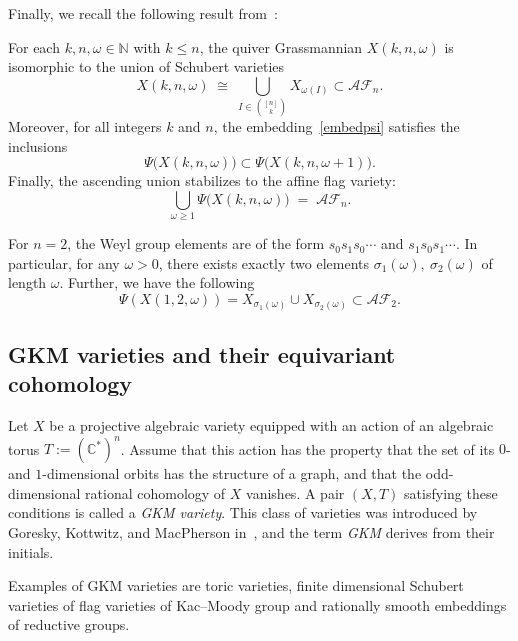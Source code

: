 \documentclass[10pt, a4paper, reqno]{amsart}
\begin{document}
Finally, we recall the following result from~\cite[Theorem 6.14, Proposition 6.15]{flp24}:
\begin{guess}\label{theo:afv_in_terms_of_qG}
	For each \( k,n, \omega\in \mathbb{N} \) with \( k\leq n \), the quiver Grassmannian \( X(k,n,\omega) \) is isomorphic to the union of Schubert varieties
	\[
	X(k,n,\omega) \;\cong\; \bigcup_{I \in \binom{[n]}{k}} X_{\omega(I)} \subset \mathscr{AF}_n.
	\]
	Moreover, for all integers \( k \) and \( n \), the embedding~\eqref{embedpsi} satisfies the inclusions
	\[
	\Psi\big(X(k,n,\omega)\big) \subset \Psi\big(X(k,n,\omega+1)\big).
	\]
	Finally, the ascending union stabilizes to the affine flag variety:
	\begin{equation}\label{eq:afv_in_terms_of_qG}
	\bigcup_{\omega \ge 1} \Psi\big(X(k,n,\omega)\big) \;=\; \mathscr{AF}_n.
	\end{equation}
\end{guess}

\begin{rema}\label{qg_with_af_pts}
	For $n=2$, the Weyl group elements are of the form $s_0s_1s_0\cdots$ and $s_1s_0s_1\cdots$.  In particular, for any $\omega>0$, there exists exactly two elements $\sigma_1(\omega),~ \sigma_2(\omega)$ of length $\omega$. Further, we have the following 
	\[\Psi(X(1,2,\omega))=X_{\sigma_1(\omega)}\cup X_{\sigma_2(\omega)}\subset \mathscr{AF}_2.\]
\end{rema}


\subsection{GKM varieties and their equivariant cohomology}\label{ss:gkm}
Let $X$ be a projective algebraic variety equipped with an action of an algebraic torus 
\( T := (\mathbb{C}^*)^n \).  
Assume that this action has the property that the set of its $0$- and $1$-dimensional orbits 
has the structure of a graph, and that the odd-dimensional rational cohomology of $X$ vanishes.  
A pair $(X,T)$ satisfying these conditions is called a \emph{GKM variety}.  
This class of varieties was introduced by Goresky, Kottwitz, and MacPherson in~\cite{gkm},  and the term \emph{GKM} derives from their initials. 

Examples of GKM varieties are toric varieties, finite dimensional Schubert varieties of flag varieties of Kac--Moody group and rationally smooth embeddings of reductive groups.  
\end{document}
